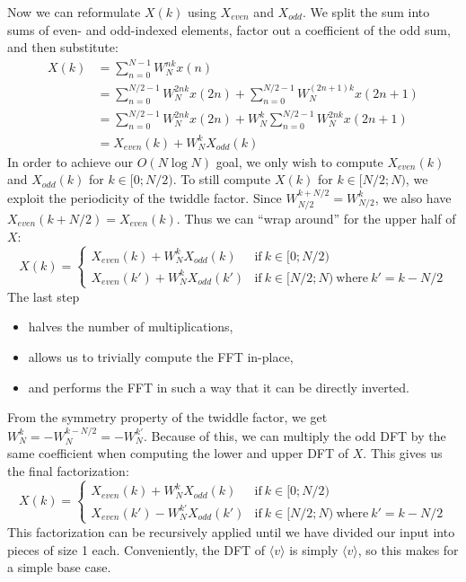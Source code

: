 Now we can reformulate $X(k)$ using $X_\textit{even}$ and $X_\textit{odd}$.
We split the sum into sums of even- and odd-indexed elements,
factor out a coefficient of the odd sum,
and then substitute:
\begin{align}
    X(k) &= \sum_{n = 0}^{N - 1} W_N^{nk} x(n) \\
    &= \sum_{n = 0}^{N/2 - 1} W_N^{2nk} x(2n) + \sum_{n = 0}^{N/2 - 1} W_N^{(2n + 1)k} x(2n + 1) \\
    &= \sum_{n = 0}^{N/2 - 1} W_N^{2nk} x(2n) + W_N^k \sum_{n = 0}^{N/2 - 1} W_N^{2nk} x(2n + 1) \\
    &= X_\textit{even}(k) + W_N^k X_\textit{odd}(k)
\end{align}
%
In order to achieve our $O(N \log N)$ goal,
we only wish to compute $X_\textit{even}(k)$ and $X_\textit{odd}(k)$ for $k \in [0;N/2)$.
To still compute $X(k)$ for $k \in [N/2;N)$, we exploit the periodicity of the twiddle factor.
Since $W_{N/2}^{k + N/2} = W_{N/2}^k$, we also have $X_\textit{even}(k + N/2) = X_\textit{even}(k)$.
Thus we can ``wrap around'' for the upper half of $X$:
\begin{equation}
    X(k) =
    \begin{cases}
        X_\textit{even}(k) + W_N^k X_\textit{odd}(k) &\text{if}~k \in [0;N/2) \\
        X_\textit{even}(k') + W_N^{k} X_\textit{odd}(k') &\text{if}~k \in [N/2;N) ~\text{where}~k' = k - N/2
    \end{cases}
\end{equation}
%
The last step
\begin{itemize}
    \item halves the number of multiplications,
    \item allows us to trivially compute the FFT in-place,
    \item and performs the FFT in such a way that it can be directly inverted.
\end{itemize}

From the symmetry property of the twiddle factor, we get $W_N^k = -W_N^{k - N/2} = -W_N^{k'}$.
Because of this,
we can multiply the odd DFT by the same coefficient when computing the lower and upper DFT of $X$.
This gives us the final factorization:
\begin{equation}
    X(k) =
    \begin{cases}
        X_\textit{even}(k) + W_N^k X_\textit{odd}(k) &\text{if}~k \in [0;N/2) \\
        X_\textit{even}(k') - W_N^{k'} X_\textit{odd}(k') &\text{if}~k \in [N/2;N) ~\text{where}~k' = k - N/2
    \end{cases}
\end{equation}
This factorization can be recursively applied
until we have divided our input into pieces of size 1 each.
Conveniently, the DFT of $\langle v \rangle$ is simply $\langle v \rangle$,
so this makes for a simple base case.


